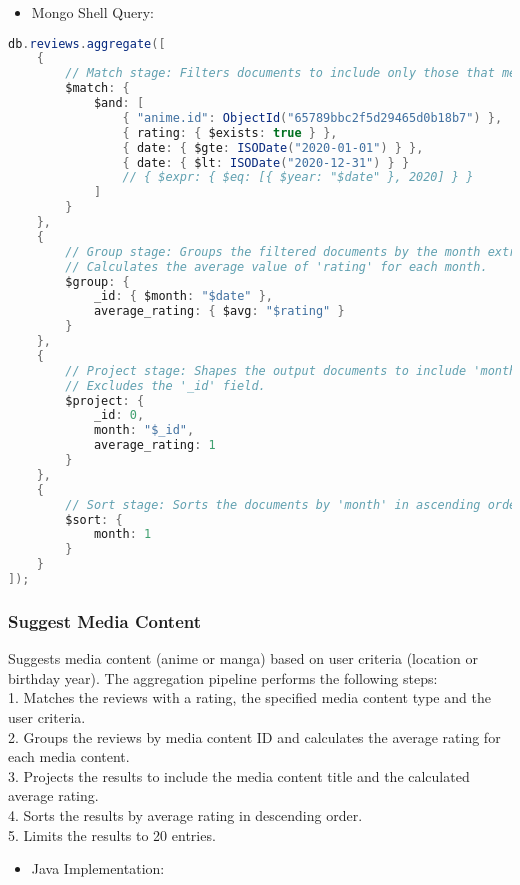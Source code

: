 \begin{itemize}
    \item Mongo Shell Query:
\end{itemize}

\begin{mdframed}[style=customstyle2]
\begin{lstlisting}[language=java, backgroundcolor=\color{white}]
db.reviews.aggregate([
    { 
        // Match stage: Filters documents to include only those that meet the specified conditions.
        $match: { 
            $and: [
                { "anime.id": ObjectId("65789bbc2f5d29465d0b18b7") },
                { rating: { $exists: true } },
                { date: { $gte: ISODate("2020-01-01") } },
                { date: { $lt: ISODate("2020-12-31") } }
                // { $expr: { $eq: [{ $year: "$date" }, 2020] } }
            ]
        } 
    },
    { 
        // Group stage: Groups the filtered documents by the month extracted from the 'date' field.
        // Calculates the average value of 'rating' for each month.
        $group: { 
            _id: { $month: "$date" },
            average_rating: { $avg: "$rating" }
        } 
    },
    { 
        // Project stage: Shapes the output documents to include 'month' and 'average_rating' fields.
        // Excludes the '_id' field.
        $project: { 
            _id: 0,
            month: "$_id",
            average_rating: 1
        } 
    },
    { 
        // Sort stage: Sorts the documents by 'month' in ascending order.
        $sort: { 
            month: 1 
        } 
    }
]);\end{lstlisting}
\end{mdframed}

\subsubsection*{Suggest Media Content}

Suggests media content (anime or manga) based on user criteria (location or birthday year).
The aggregation pipeline performs the following steps:\\
1. Matches the reviews with a rating, the specified media content type and the user criteria.\\
2. Groups the reviews by media content ID and calculates the average rating for each media content.\\
3. Projects the results to include the media content title and the calculated average rating.\\
4. Sorts the results by average rating in descending order.\\
5. Limits the results to 20 entries.
\begin{itemize}
    \item Java Implementation:
\end{itemize}

